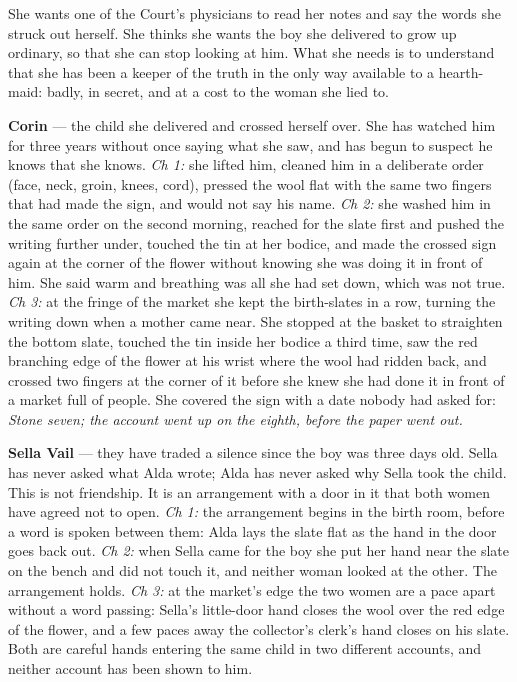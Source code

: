 \documentclass{design/chronicle}
\begin{document}
{
She wants one of the Court’s physicians to read her notes and say the words she struck out herself. She thinks she wants the boy she delivered to grow up ordinary, so that she can stop looking at him. What she needs is to understand that she has been a keeper of the truth in the only way available to a hearth-maid: badly, in secret, and at a cost to the woman she lied to.

\textbf{Corin} — the child she delivered and crossed herself over. She has watched him for three years without once saying what she saw, and has begun to suspect he knows that she knows. \emph{Ch 1:} she lifted him, cleaned him in a deliberate order (face, neck, groin, knees, cord), pressed the wool flat with the same two fingers that had made the sign, and would not say his name. \emph{Ch 2:} she washed him in the same order on the second morning, reached for the slate first and pushed the writing further under, touched the tin at her bodice, and made the crossed sign again at the corner of the flower without knowing she was doing it in front of him. She said warm and breathing was all she had set down, which was not true. \emph{Ch 3:} at the fringe of the market she kept the birth-slates in a row, turning the writing down when a mother came near. She stopped at the basket to straighten the bottom slate, touched the tin inside her bodice a third time, saw the red branching edge of the flower at his wrist where the wool had ridden back, and crossed two fingers at the corner of it before she knew she had done it in front of a market full of people. She covered the sign with a date nobody had asked for: \emph{Stone seven; the account went up on the eighth, before the paper went out.}

\textbf{Sella Vail} — they have traded a silence since the boy was three days old. Sella has never asked what Alda wrote; Alda has never asked why Sella took the child. This is not friendship. It is an arrangement with a door in it that both women have agreed not to open. \emph{Ch 1:} the arrangement begins in the birth room, before a word is spoken between them: Alda lays the slate flat as the hand in the door goes back out. \emph{Ch 2:} when Sella came for the boy she put her hand near the slate on the bench and did not touch it, and neither woman looked at the other. The arrangement holds. \emph{Ch 3:} at the market’s edge the two women are a pace apart without a word passing: Sella’s little-door hand closes the wool over the red edge of the flower, and a few paces away the collector’s clerk’s hand closes on his slate. Both are careful hands entering the same child in two different accounts, and neither account has been shown to him.

}
\end{document}
